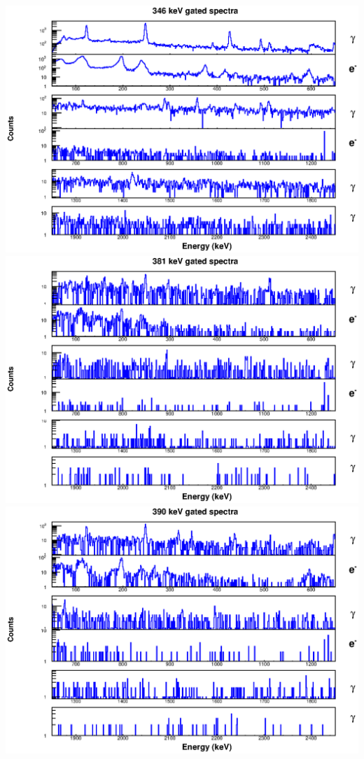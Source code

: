 \begin{landscape}
\includegraphics[scale=1.1]{154Gd_Appendix/346_combined.eps}
\includegraphics[scale=1.1]{154Gd_Appendix/381_combined.eps}
\includegraphics[scale=1.1]{154Gd_Appendix/390_combined.eps}

\end{landscape}
